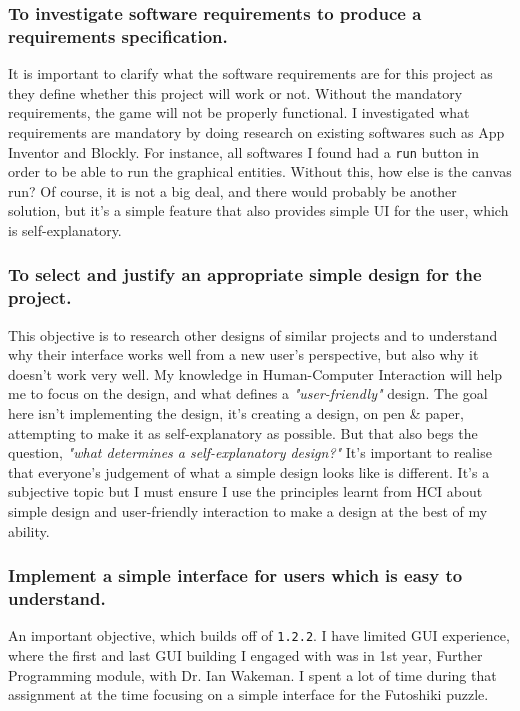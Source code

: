\documentclass[a4paper, 12pt]{article}
\begin{document}
            \subsubsection{To investigate software requirements to produce a requirements
            specification.}
                It is important to clarify what the software requirements are for this project as they
                define whether this project will work or not. Without the mandatory requirements,
                the game will not be properly functional. I investigated what requirements are mandatory
                by doing research on existing softwares such as App Inventor and Blockly. For instance,
                all softwares I found had a \texttt{run} button in order to be able to run the graphical
                entities. Without this, how else is the canvas run? Of course, it is not a big deal, and
                there would probably be another solution, but it's a simple feature that also provides
                simple UI for the user, which is self-explanatory.

            \subsubsection{To select and justify an appropriate simple design for the
            project.}
                This objective is to research other designs of similar projects and to understand
                why their interface works well from a new user's perspective, but also why it
                doesn't work very well. My knowledge in Human-Computer Interaction will help me
                to focus on the design, and what defines a \textit{"user-friendly"} design.
                The goal here isn't implementing the design, it's creating a design, on pen \& paper,
                attempting to make it as self-explanatory as possible. But that also begs the question,
                \textit{"what determines a self-explanatory design?"} It's important to realise that
                everyone's judgement of what a simple design looks like is different. It's a subjective
                topic but I must ensure I use the principles learnt from HCI about simple design and
                user-friendly interaction to make a design at the best of my ability.
            
            \subsubsection{Implement a simple interface for users which is easy to
            understand.}
                An important objective, which builds off of \texttt{1.2.2}. I have limited GUI
                experience, where the first and last GUI building I engaged with was in 1st year,
                Further Programming module, with Dr. Ian Wakeman. I spent a lot of time during that
                assignment at the time focusing on a simple interface for the Futoshiki puzzle. \\
\end{document}
